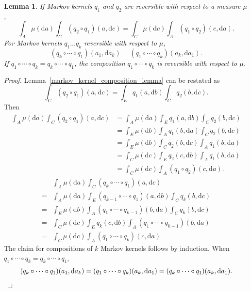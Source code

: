 \documentclass[english,twoside,openright]{HYgraduMLDS}
\newtheorem{lemma}{Lemma}
\newcommand{\dx}{\mathrm{d}}
\begin{document}
\begin{lemma}\label{composition_reversible_lemma}
	If Markov kernels \(q_{1}\) and \(q_{2}\) are reversible with respect to a
  measure \(\mu\),
  \[
    \int_{A}\mu(\dx a)\int_{C}(q_{2}\circ q_{1})(a, \dx c)
    = \int_{C}\mu(\dx c)\int_{A}(q_{1}\circ q_{2})(c, \dx a).
  \]
  For Markov kernels \(q_{1}\dotsc q_{k}\) reversible with respect to \(\mu\),
  \[
    (q_{k}\circ \dotsb \circ q_{1})(a_{1}, \dx a_{k})
    = (q_{1}\circ \dotsb \circ q_{k})(a_{k}, \dx a_{1}).
  \]
  If \(q_{1}\circ \dotsb \circ q_{k} = q_{k}\circ \dotsb \circ q_{1}\),
  the composition \(q_{1}\circ \dotsb \circ q_{k}\) is reversible with
  respect to \(\mu\).
\end{lemma}
\begin{proof}
  Lemma~\ref{markov_kernel_composition_lemma} can be restated as
  \[
    \int_{C}(q_{2}\circ q_{1})(a, \dx c) = \int_{E}q_{1}(a, \dx b)\int_{C}q_{2}(b, \dx c).
  \]
  Then
	\begin{align*}
    \int_{A}\mu(\dx a)\int_{C}(q_{2}\circ q_{1})(a, \dx c)
    &= \int_{A}\mu(\dx a)\int_{E}q_{1}(a, \dx b)\int_{C}q_{2}(b, \dx c)
    \\&= \int_{E}\mu(\dx b)\int_{A}q_{1}(b, \dx a)\int_{C}q_{2}(b, \dx c)
    \\&= \int_{E}\mu(\dx b)\int_{C}q_{2}(b, \dx c)\int_{A}q_{1}(b, \dx a)
    \\&= \int_{C}\mu(\dx c)\int_{E}q_{2}(c, \dx b)\int_{A}q_{1}(b, \dx a)
    \\&= \int_{C}\mu(\dx c)\int_{A}(q_{1}\circ q_{2})(c, \dx a).
  \end{align*}
  \begin{align*}
    &\int_{A}\mu(\dx a)\int_{C}(q_{k}\circ\dotsb \circ q_{1})(a, \dx c)
    \\=& \int_{A}\mu(\dx a)\int_{E}(q_{k-1}\circ \dotsb \circ q_{1})(a, \dx b)
      \int_{C}q_{k}(b, \dx c)
    \\=& \int_{E}\mu(\dx b)\int_{A}(q_{1}\circ \dotsb \circ q_{k-1})(b, \dx a)
      \int_{C}q_{k}(b, \dx c)
    \\=& \int_{C}\mu(\dx c) \int_{E}q_{k}(c, \dx b)
         \int_{A}(q_{1}\circ \dotsb \circ q_{k-1})(b, \dx a)
    \\=&\int_{C}\mu(\dx c)\int_{A}(q_{1}\circ\dotsb \circ q_{k})(c, \dx a)
  \end{align*}
  The claim for compositions of \(k\) Markov kernels follows by induction.
  When \(q_{1}\circ \dotsb \circ q_{k} = q_{k}\circ \dotsb \circ q_{1}\),
  \[
    (q_{k}\circ \dotsb \circ q_{1})(a_{1}, \dx a_{k})
    = (q_{1}\circ \dotsb \circ q_{k})(a_{k}, \dx a_{1})
    = (q_{k}\circ \dotsb \circ q_{1})(a_{k}, \dx a_{1}).
    \qedhere
  \]
\end{proof}
\end{document}

